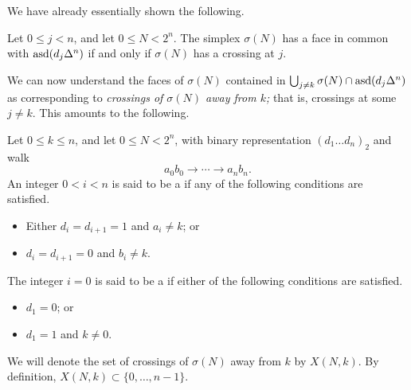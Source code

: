 \documentclass[main.tex]{subfiles}
\begin{document}
We have already essentially shown the following.

\begin{lemma}
  \label{lemma:faces_intersecting_faces_are_crossings_at}
  Let $0 \leq j < n$, and let $0 \leq N < 2^{n}$. The simplex $\sigma(N)$ has a face in common with $\mathrm{asd}(d_{j}\Delta^{n})$ if and only if $\sigma(N)$ has a crossing at $j$.
\end{lemma}

We can now understand the faces of $\sigma(N)$ contained in $\bigcup_{j \neq k} \sigma(N) \cap \mathrm{asd}(d_{j}\Delta^{n})$ as corresponding to \emph{crossings of $\sigma(N)$ away from $k$;} that is, crossings at some $j \neq k$. This amounts to the following.

\begin{definition}
  Let $0 \leq k \leq n$, and let $0 \leq N < 2^{n}$, with binary representation $(d_{1}\ldots d_{n})_{2}$ and walk
  \begin{equation*}
    a_{0}b_{0} \to \cdots \to a_{n}b_{n}.
  \end{equation*}
  An integer $0 < i < n$ is said to be a  if any of the following conditions are satisfied.
  \begin{itemize}
    \item Either $d_{i} = d_{i + 1} = 1$ and $a_{i} \neq k$; or

    \item $d_{i} = d_{i+1} = 0$ and $b_{i} \neq k$.
  \end{itemize}

  The integer $i = 0$ is said to be a  if either of the following conditions are satisfied.
  \begin{itemize}
    \item $d_{1} = 0$; or

    \item $d_{1} = 1$ and $k \neq 0$.
  \end{itemize}

  We will denote the set of crossings of $\sigma(N)$ away from $k$ by $X(N, k)$. By definition, $X(N, k) \subset \{0, \ldots, n-1\}$.
\end{definition}
\end{document}

